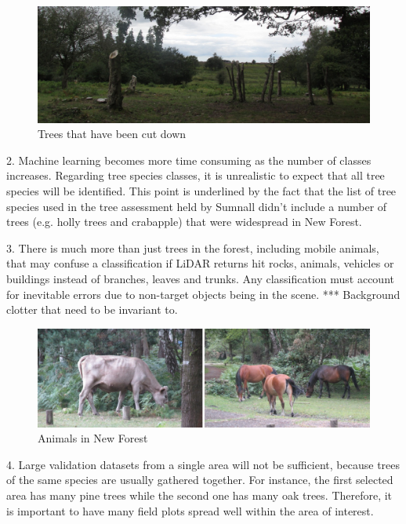 \documentclass{subfiles}
\begin{document}
    \begin{figure} [!h]
    	\centering
    	\includegraphics[width=\textwidth]{img/NewForest/CC_TreesCutDown}
    	\caption{Trees that have been cut down}
    	\label{fig:CC_TreesCutDown}
    \end{figure}

    \par 2. Machine learning becomes more time consuming as the number of classes increases. Regarding tree species classes, it is unrealistic to expect that all tree species will be identified.  This point is underlined by the fact that the list of tree species used in the tree assessment held by Sumnall \cite{Sumnall2013} didn’t include a number of trees (e.g. holly trees and crabapple) that were widespread in New Forest. 
    
    \par 3.	There is much more than just trees in the forest, including mobile animals, that may confuse a classification if LiDAR returns hit rocks, animals, vehicles or buildings instead of branches, leaves and trunks.  Any classification must account for inevitable errors due to non-target objects being in the scene.
    {\color{red} *** Background clotter that need to be invariant to. }
        \begin{figure} [!h]
        	\centering
        	\includegraphics[width=\textwidth]{img/NewForest/CC_Animals}
        	\caption{Animals in New Forest}
        	\label{fig:CC_Animals}
        \end{figure}
    
    \par 4.	Large validation datasets from a single area will not be sufficient, because trees of the same species are usually gathered together. For instance, the first selected area has many pine trees while the second one has many oak trees. Therefore, it is important to have many field plots spread well within the area of interest.  
    
\end{document}
